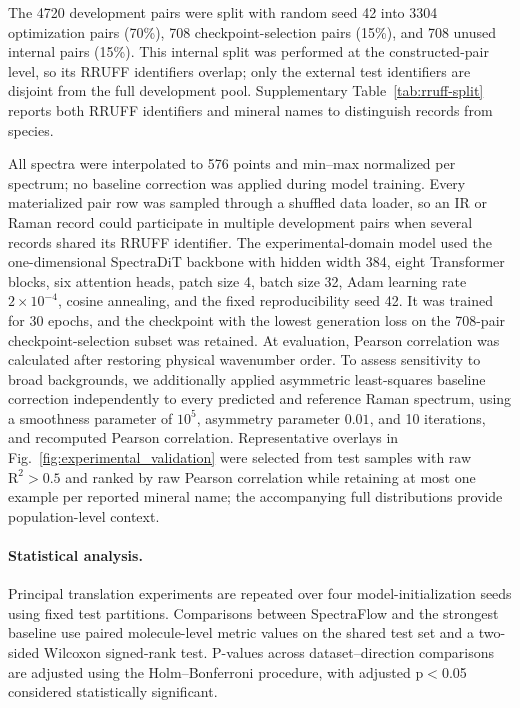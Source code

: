 \documentclass[pdflatex,sn-mathphys-num]{sn-jnl}%
\theoremstyle{thmstyleone}%
\theoremstyle{thmstyletwo}%
\theoremstyle{thmstylethree}%
\begin{document}
The 4720 development pairs were split with random seed 42 into 3304 optimization pairs (70\%), 708 checkpoint-selection pairs (15\%), and 708 unused internal pairs (15\%). This internal split was performed at the constructed-pair level, so its RRUFF identifiers overlap; only the external test identifiers are disjoint from the full development pool. Supplementary Table~\ref{tab:rruff-split} reports both RRUFF identifiers and mineral names to distinguish records from species.


All spectra were interpolated to 576 points and min--max normalized per spectrum; no baseline correction was applied during model training. Every materialized pair row was sampled through a shuffled data loader, so an IR or Raman record could participate in multiple development pairs when several records shared its RRUFF identifier. The experimental-domain model used the one-dimensional SpectraDiT backbone with hidden width 384, eight Transformer blocks, six attention heads, patch size 4, batch size 32, Adam learning rate $2\times10^{-4}$, cosine annealing, and the fixed reproducibility seed 42. It was trained for 30 epochs, and the checkpoint with the lowest generation loss on the 708-pair checkpoint-selection subset was retained. At evaluation, Pearson correlation was calculated after restoring physical wavenumber order. To assess sensitivity to broad backgrounds, we additionally applied asymmetric least-squares baseline correction independently to every predicted and reference Raman spectrum, using a smoothness parameter of $10^5$, asymmetry parameter $0.01$, and 10 iterations, and recomputed Pearson correlation. Representative overlays in Fig.~\ref{fig:experimental_validation} were selected from test samples with raw $\text{R}^2>0.5$ and ranked by raw Pearson correlation while retaining at most one example per reported mineral name; the accompanying full distributions provide population-level context.

\paragraph{Statistical analysis.} Principal translation experiments are repeated over four model-initialization seeds using fixed test partitions. Comparisons between SpectraFlow and the strongest baseline use paired molecule-level metric values on the shared test set and a two-sided Wilcoxon signed-rank test. P-values across dataset–direction comparisons are adjusted using the Holm–Bonferroni procedure, with adjusted p$<$0.05 considered statistically significant.
\end{document}
